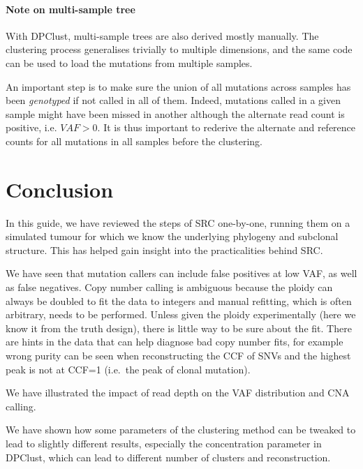 \documentclass[]{article}
\let\oldparagraph\paragraph
\renewcommand{\paragraph}[1]{\oldparagraph{#1}\mbox{}}
\begin{document}
\hypertarget{note-on-multi-sample-tree}{%
\paragraph{Note on multi-sample tree}\label{note-on-multi-sample-tree}}

With DPClust, multi-sample trees are also derived mostly manually. The
clustering process generalises trivially to multiple dimensions, and the
same code can be used to load the mutations from multiple samples.

An important step is to make sure the union of all mutations across
samples has been \emph{genotyped} if not called in all of them. Indeed,
mutations called in a given sample might have been missed in another
although the alternate read count is positive, i.e. \({VAF}>0\). It is
thus important to rederive the alternate and reference counts for all
mutations in all samples before the clustering.

\newpage

\hypertarget{conclusion}{%
\section{Conclusion}\label{conclusion}}

In this guide, we have reviewed the steps of SRC one-by-one, running
them on a simulated tumour for which we know the underlying phylogeny
and subclonal structure. This has helped gain insight into the
practicalities behind SRC.

We have seen that mutation callers can include false positives at low
VAF, as well as false negatives. Copy number calling is ambiguous
because the ploidy can always be doubled to fit the data to integers and
manual refitting, which is often arbitrary, needs to be performed.
Unless given the ploidy experimentally (here we know it from the truth
design), there is little way to be sure about the fit. There are hints
in the data that can help diagnose bad copy number fits, for example
wrong purity can be seen when reconstructing the CCF of SNVs and the
highest peak is not at CCF=1 (i.e.~the peak of clonal mutation).

We have illustrated the impact of read depth on the VAF distribution and
CNA calling.

We have shown how some parameters of the clustering method can be
tweaked to lead to slightly different results, especially the
concentration parameter in DPClust, which can lead to different number
of clusters and reconstruction.
\end{document}
